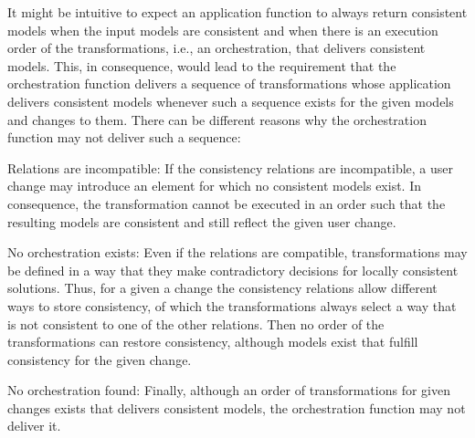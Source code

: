 It might be intuitive to expect an application function to always return consistent models when the input models are consistent and when there is an execution order of the transformations, i.e., an orchestration, that delivers consistent models.
This, in consequence, would lead to the requirement that the orchestration function delivers a sequence of transformations whose application delivers consistent models whenever such a sequence exists for the given models and changes to them.
There can be different reasons why the orchestration function may not deliver such a sequence:
\begin{properdescription}
    \item[Relations are incompatible:] If the consistency relations are incompatible, a user change may introduce an element for which no consistent models exist. In consequence, the transformation cannot be executed in an order such that the resulting models are consistent and still reflect the given user change.
    \item[No orchestration exists:] Even if the relations are compatible, transformations may be defined in a way that they make contradictory decisions for locally consistent solutions. Thus, for a given a change the consistency relations allow different ways to store consistency, of which the transformations always select a way that is not consistent to one of the other relations.
    Then no order of the transformations can restore consistency, although models exist that fulfill consistency for the given change.
    \item[No orchestration found:] Finally, although an order of transformations for given changes exists that delivers consistent models, the orchestration function may not deliver it. 
\end{properdescription}

